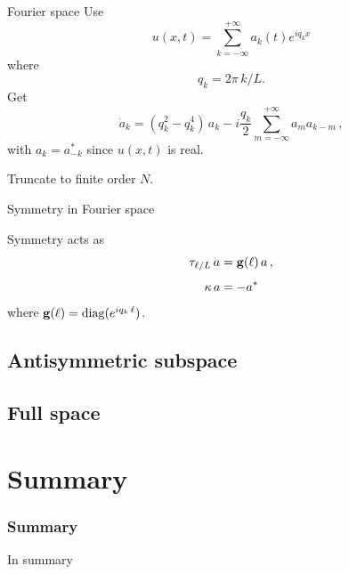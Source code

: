 \documentclass{beamer}
\begin{document}
\begin{frame}{Fourier space}
Use
\[
  u(x,t)=\sum_{k=-\infty}^{+\infty} a_k (t) e^{ i q_k x }
\]
where
\[
 q_k = 2\pi\,k/L.
\]
Get
\[
 \dot{a}_k
     = ( q_k^2 - q_k^4 )\, a_k
    - i \frac{q_k}{2} \sum_{m=-\infty}^{+\infty} a_m a_{k-m}\,,
\]
with $a_{k}=a^\ast_{-k}$ since $u(x,t)$ is real.

Truncate to finite order $N$.
\end{frame}

\begin{frame}{Symmetry in Fourier space}

Symmetry acts as
\[
  \tau_{\ell/L}\, a = \mathbf{g}(\ell) \, a \,,
  \label{eq:shiftF}
\]
\[
   \kappa \, a = -a^\ast
\]
where $\mathbf{g}(\ell) = \mathrm{diag}( e^{i q_k\, \ell} )$.

\end{frame}




\subsection{Antisymmetric subspace}

\subsection{Full space}

\section*{Summary}
\begin{frame}
\frametitle<presentation>{Summary}

In summary

\end{frame}
\end{document}
